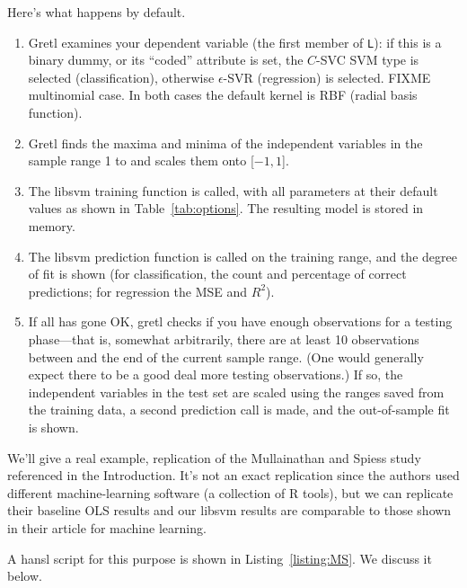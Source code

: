 \documentclass{article}
\begin{document}
Here's what happens by default.
\begin{enumerate}
\item Gretl examines your dependent variable (the first member of
  \texttt{L}): if this is a binary dummy, or its ``coded'' attribute is
  set, the $C$-SVC SVM type is selected (classification), otherwise
  $\epsilon$-SVR (regression) is selected. FIXME multinomial case. In
  both cases the default kernel is RBF (radial basis function).
\item Gretl finds the maxima and minima of the independent variables
  in the sample range 1 to  and scales them onto
  [$-1,1$].
\item The \textsf{libsvm} training function is called, with all
  parameters at their default values as shown in
  Table~\ref{tab:options}. The resulting model is stored in memory.
\item The \textsf{libsvm} prediction function is called on the
  training range, and the degree of fit is shown (for classification,
  the count and percentage of correct predictions; for regression the
  MSE and $R^2$).
\item If all has gone OK, gretl checks if you have enough observations
  for a testing phase---that is, somewhat arbitrarily, there are at
  least 10 observations between  and the end of the
  current sample range. (One would generally expect there to be a good
  deal more testing observations.) If so, the independent variables in
  the test set are scaled using the ranges saved from the training
  data, a second prediction call is made, and the out-of-sample fit is
  shown.
\end{enumerate}

We'll give a real example, replication of the Mullainathan and Spiess
study referenced in the Introduction. It's not an exact replication
since the authors used different machine-learning software (a
collection of \textsf{R} tools), but we can replicate their baseline
OLS results and our \textsf{libsvm} results are comparable to those
shown in their article for machine learning.

A hansl script for this purpose is shown in Listing~\ref{listing:MS}.
We discuss it below.
\end{document}
